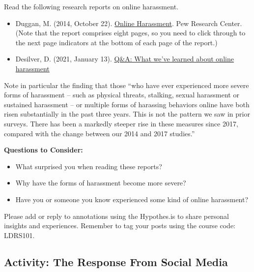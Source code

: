 \documentclass[
]{book}
\providecommand{\tightlist}{%
  \setlength{\itemsep}{0pt}\setlength{\parskip}{0pt}}
\theoremstyle{definition}
\theoremstyle{definition}
\theoremstyle{definition}
\theoremstyle{definition}
\theoremstyle{remark}
\begin{document}
\begin{reflect}
Read the following research reports on online harassment.

\begin{itemize}
\item
  Duggan, M. (2014, October 22). \href{https://www.pewresearch.org/internet/2014/10/22/online-harassment/}{Online Harassment}. Pew Research Center. (Note that the report comprises eight pages, so you need to click through to the next page indicators at the bottom of each page of the report.)
\item
  Desilver, D. (2021, January 13). \href{https://www.pewresearch.org/short-reads/2021/01/13/qa-what-weve-learned-about-online-harassment/}{Q\&A: What we've learned about online harassment}
\end{itemize}

Note in particular the finding that those ``who have ever experienced more severe forms of harassment -- such as physical threats, stalking, sexual harassment or sustained harassment -- or multiple forms of harassing behaviors online have both risen substantially in the past three years. This is not the pattern we saw in prior surveys. There has been a markedly steeper rise in these measures since 2017, compared with the change between our 2014 and 2017 studies.''

\textbf{Questions to Consider:}

\begin{itemize}
\tightlist
\item
  What surprised you when reading these reports?\\
\item
  Why have the forms of harassment become more severe?\\
\item
  Have you or someone you know experienced some kind of online harassment?
\end{itemize}

Please add or reply to annotations using the Hypothes.is to share personal insights and experiences. Remember to tag your posts using the course code: LDRS101.
\end{reflect}

\hypertarget{activity-the-response-from-social-media}{%
\subsection*{Activity: The Response From Social Media}\label{activity-the-response-from-social-media}}
\end{document}
